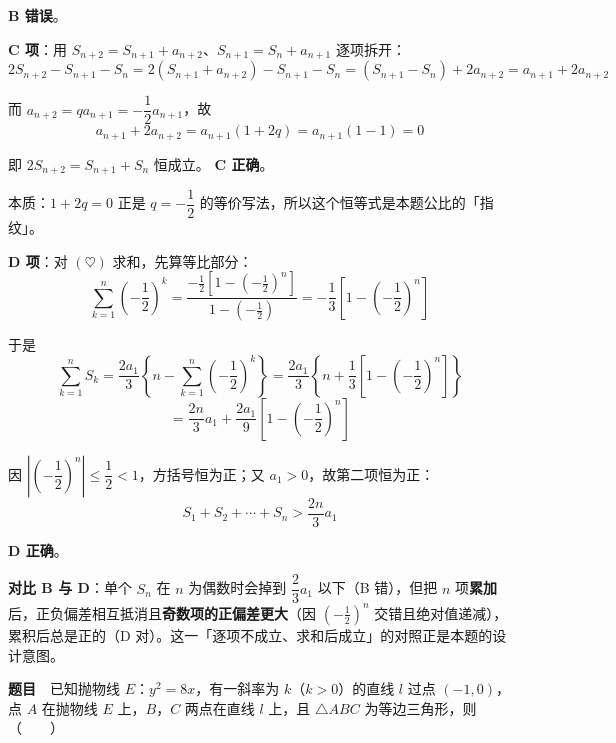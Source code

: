  \textbf{B 错误}。

\par\medskip

\textbf{C 项}：用 $S_{n+2}=S_{n+1}+a_{n+2}$、$S_{n+1}=S_n+a_{n+1}$ 逐项拆开：
\[2S_{n+2}-S_{n+1}-S_n=2\left(S_{n+1}+a_{n+2}\right)-S_{n+1}-S_n=\left(S_{n+1}-S_n\right)+2a_{n+2}=a_{n+1}+2a_{n+2}\]

而 $a_{n+2}=qa_{n+1}=-\dfrac12a_{n+1}$，故
\[a_{n+1}+2a_{n+2}=a_{n+1}(1+2q)=a_{n+1}\left(1-1\right)=0\]

即 $2S_{n+2}=S_{n+1}+S_n$ 恒成立。 \textbf{C 正确}。

\begin{gktip}
本质：$1+2q=0$ 正是 $q=-\dfrac12$ 的等价写法，所以这个恒等式是本题公比的「指纹」。
\end{gktip}

\par\medskip

\textbf{D 项}：对 $(\heartsuit)$ 求和，先算等比部分：
\[\sum_{k=1}^{n}\left(-\frac12\right)^k=\frac{-\frac12\left[1-\left(-\frac12\right)^n\right]}{1-\left(-\frac12\right)}=-\frac13\left[1-\left(-\frac12\right)^n\right]\]

于是
\[\sum_{k=1}^{n}S_k=\frac{2a_1}{3}\left\{n-\sum_{k=1}^{n}\left(-\frac12\right)^k\right\}=\frac{2a_1}{3}\left\{n+\frac13\left[1-\left(-\frac12\right)^n\right]\right\}\]
\[=\frac{2n}{3}a_1+\frac{2a_1}{9}\left[1-\left(-\frac12\right)^n\right]\]

因 $\left|\left(-\dfrac12\right)^n\right|\le\dfrac12<1$，方括号恒为正；又 $a_1>0$，故第二项恒为正：
\[S_1+S_2+\cdots+S_n>\frac{2n}{3}a_1\]

 \textbf{D 正确}。


\begin{gktip}
\textbf{对比 B 与 D}：单个 $S_n$ 在 $n$ 为偶数时会掉到 $\dfrac23a_1$ 以下（B 错），但把 $n$ 项\textbf{累加}后，正负偏差相互抵消且\textbf{奇数项的正偏差更大}（因 $\left(-\frac12\right)^n$ 交错且绝对值递减），累积后总是正的（D 对）。这一「逐项不成立、求和后成立」的对照正是本题的设计意图。
\end{gktip}

\par\medskip


\textbf{题目}　已知抛物线 $E$：$y^2=8x$，有一斜率为 $k$（$k>0$）的直线 $l$ 过点 $(-1,0)$，点 $A$ 在抛物线 $E$ 上，$B$，$C$ 两点在直线 $l$ 上，且 $\triangle ABC$ 为等边三角形，则（　　）


